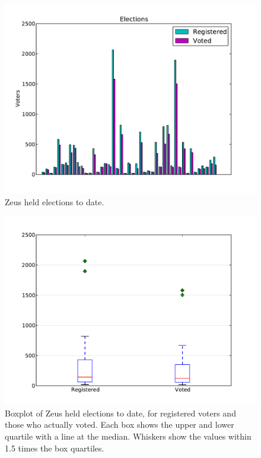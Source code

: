 \documentclass[letterpaper,10pt]{article}
\begin{document}
\begin{figure}[ht]
  \begin{center}
    \includegraphics[scale=0.7]{elections_to_date.pdf}
  \end{center}
  \caption{Zeus held elections to date.}
  \label{fig:elections_to_date}
\end{figure}

\begin{figure}[ht]
  \begin{center}
    \includegraphics[scale=0.7]{elections_to_date_boxplot.pdf}
  \end{center}
  \caption{Boxplot of Zeus held elections to date, for registered
    voters and those who actually voted. Each box shows the upper and
    lower quartile with a line at the median. Whiskers show the values
    within 1.5 times the box quartiles.}
  \label{fig:elections_to_date_boxplot}
\end{figure}
\end{document}
